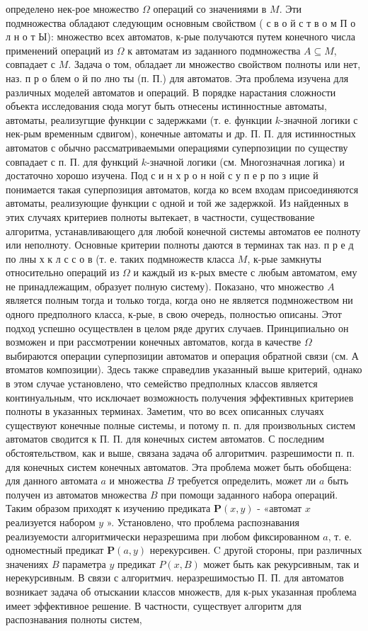 \documentclass[10pt]{article}
\begin{document}
определено нек-рое множество $\Omega$ операций со значениями в $M$. Эти подмножества обладают следующим основным свойством ( с в о й с т в о м П о л н о т Ы): множество всех автоматов, к-рые получаются путем конечного числа применений операций из $\Omega$ к автоматам из заданного подмножества $A \subseteq M$, совпадает с $M$. Задача о том, обладает ли множество свойством полноты или нет, наз. п р о блем о й по лно ты (п. П.) для автоматов. Эта проблема изучена для различных моделей автоматов и операций. В порядке нарастания сложности объекта исследования сюда могут быть отнесены истинностные автоматы, автоматы, реализугщие функции с задержками (т. е. функции $k$-значной логики с нек-рым временным сдвигом), конечные автоматы и др. П. П. для истинностных автоматов с обычно рассматриваемыми операциями суперпозиции по существу совпадает с п. П. для функций $k$-значной логики (см. Многозначная логика) и достаточно хорошо изучена. Под с и н х р о н ной с у п е р по з ицие й понимается такая суперпозиция автоматов, когда ко всем входам присоединяются автоматы, реализующие функции с одной и той же задержкой. Из найденных в этих случаях критериев полноты вытекает, в частности, существование алгоритма, устанавливающего для любой конечной системы автоматов ее полноту или неполноту. Основные критерии полноты даются в терминах так наз. п р е д по лны х к л с с о в (т. е. таких подмножеств класса $M$, к-рые замкнуты относительно операций из $\Omega$ и каждый из к-рых вместе с любым автоматом, ему не принадлежащим, образует полную систему). Показано, что множество $A$ является полным тогда и только тогда, когда оно не является подмножеством ни одного предполного класса, к-рые, в свою очередь, полностью описаны. Этот подход успешно осуществлен в целом ряде других случаев. Принципиально он возможен и при рассмотрении конечных автоматов, когда в качестве $\Omega$ выбираются операции суперпозиции автоматов и операция обратной связи (см. А втоматов композиции). Здесь также справедлив указанный выше критерий, однако в этом случае установлено, что семейство предполных классов является континуальным, что исключает возможность получения эффективных критериев полноты в указанных терминах. Заметим, что во всех описанных случаях существуют конечные полные системы, и потому п. п. для произвольных систем автоматов сводится к П. П. для конечных систем автоматов. С последним обстоятельством, как и выше, связана задача об алгоритмич. разрешимости п. п. для конечных систем конечных автоматов. Эта проблема может быть обобщена: для данного автомата $a$ и множества $B$ требуется определить, может ли $a$ быть получен из автоматов множества $B$ при помощи заданного набора операций. Таким образом приходят к изучению предиката $\boldsymbol{P}(x, y)$ - «автомат $x$ реализуется набором $y$ ». Установлено, что проблема распознавания реализуемости алгоритмически неразрешима при любом фиксированном $a$, т. е. одноместный предикат $\boldsymbol{P}(a, y)$ нерекурсивен. C другой стороны, при различных значениях $B$ параметра $y$ предикат $P(x, B)$ может быть как рекурсивным, так и нерекурсивным. В связи с алгоритмич. неразрешимостью П. П. для автоматов возникает задача об отыскании классов множеств, для к-рых указанная проблема имеет эффективное решение. В частности, существует алгоритм для распознавания полноты систем, 
\end{document}
